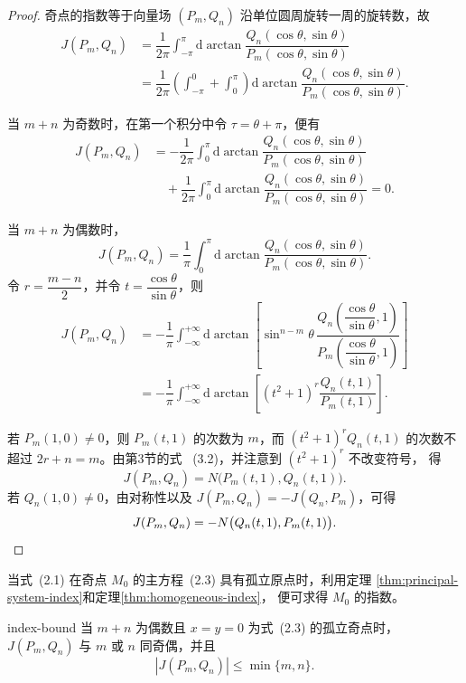 \begin{proof}
奇点的指数等于向量场 $(P_m,Q_n)$ 沿单位圆周旋转一周的旋转数，故
\[
\begin{aligned}
J(P_m,Q_n)
&=\dfrac{1}{2\pi}\int_{-\pi}^{\pi}
\mathrm{d}\arctan\dfrac{Q_n(\cos\theta,\sin\theta)}
{P_m(\cos\theta,\sin\theta)}\\
&=\dfrac{1}{2\pi}\left(\int_{-\pi}^{0}+\int_{0}^{\pi}\right)
\mathrm{d}\arctan\dfrac{Q_n(\cos\theta,\sin\theta)}
{P_m(\cos\theta,\sin\theta)}.
\end{aligned}
\]

当 $m+n$ 为奇数时，在第一个积分中令 $\tau=\theta+\pi$，便有
\[
\begin{aligned}
J(P_m,Q_n)
&=-\dfrac{1}{2\pi}\int_{0}^{\pi}
\mathrm{d}\arctan\dfrac{Q_n(\cos\theta,\sin\theta)}
{P_m(\cos\theta,\sin\theta)}\\
&\quad+\dfrac{1}{2\pi}\int_{0}^{\pi}
\mathrm{d}\arctan\dfrac{Q_n(\cos\theta,\sin\theta)}
{P_m(\cos\theta,\sin\theta)}=0.
\end{aligned}
\]

当 $m+n$ 为偶数时，
\[
J(P_m,Q_n)=\dfrac{1}{\pi}\int_{0}^{\pi}
\mathrm{d}\arctan\dfrac{Q_n(\cos\theta,\sin\theta)}
{P_m(\cos\theta,\sin\theta)}.
\]
令 $r=\dfrac{m-n}{2}$，并令 $t=\dfrac{\cos\theta}{\sin\theta}$，则
\[
\begin{aligned}
J(P_m,Q_n)
&=-\dfrac{1}{\pi}\int_{-\infty}^{+\infty}
\mathrm{d}\arctan\left[
\sin^{n-m}\theta\,
\dfrac{Q_n\left(\dfrac{\cos\theta}{\sin\theta},1\right)}
{P_m\left(\dfrac{\cos\theta}{\sin\theta},1\right)}
\right]\\
&=-\dfrac{1}{\pi}\int_{-\infty}^{+\infty}
\mathrm{d}\arctan\left[
(t^2+1)^r\dfrac{Q_n(t,1)}{P_m(t,1)}
\right].
\end{aligned}
\]

若 $P_m(1,0)\ne0$，则 $P_m(t,1)$ 的次数为 $m$，而
$(t^2+1)^rQ_n(t,1)$ 的次数不超过 $2r+n=m$。由第3节的式
~(3.2)，并注意到 $(t^2+1)^r$ 不改变符号，
得
\[
J(P_m,Q_n)=N\bigl(P_m(t,1),Q_n(t,1)\bigr).
\]
若 $Q_n(1,0)\ne0$，由对称性以及
$J(P_m,Q_n)=-J(Q_n,P_m)$，可得
\[
J(P_m,Q_n)=-N\bigl(Q_n(t,1),P_m(t,1)\bigr).\qedhere
\]
\end{proof}

当式~(2.1) 在奇点 $M_0$ 的主方程~(2.3) 具有孤立原点时，利用定理
\ref{thm:principal-system-index}和定理\ref{thm:homogeneous-index}，
便可求得 $M_0$ 的指数。

\begin{theorem}{}{index-bound}
当 $m+n$ 为偶数且 $x=y=0$ 为式~(2.3) 的孤立奇点时，
$J(P_m,Q_n)$ 与 $m$ 或 $n$ 同奇偶，并且
\[
\left|J(P_m,Q_n)\right|\leq\min\{m,n\}. \tag{4.1}
\]
\end{theorem}


